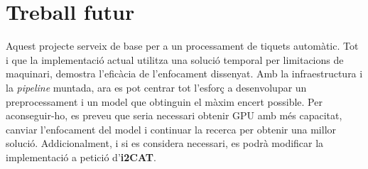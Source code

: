 \section{Treball futur}
Aquest projecte serveix de base per a un processament de tiquets automàtic. Tot i que la implementació actual utilitza una solució temporal per limitacions de maquinari, demostra l'eficàcia de l'enfocament dissenyat. Amb la infraestructura i la \textit{pipeline} muntada, ara es pot centrar tot l'esforç a desenvolupar un preprocessament i un model que obtinguin el màxim encert possible. Per aconseguir-ho, es preveu que seria necessari obtenir GPU amb més capacitat, canviar l'enfocament del model i continuar la recerca per obtenir una millor solució. Addicionalment, i si es considera necessari, es podrà modificar la implementació a petició d'\textbf{i2CAT}.